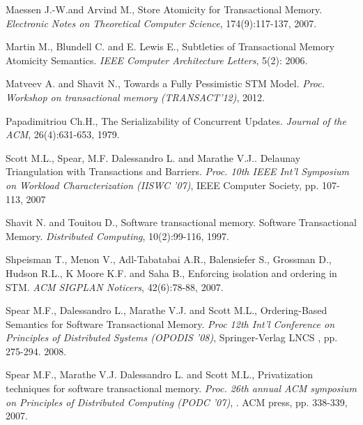\documentclass[11pt,letterpaper]{article}
\begin{document}
{\begin{thebibliography}{guerraoui08}
 Maessen J.-W.and Arvind M.,
 Store Atomicity for Transactional Memory. 
{\it Electronic  Notes  on Theoretical  Computer Science}, 
174(9):117-137, 2007.


 Martin M.,  Blundell C.  and E. Lewis E.,
 Subtleties of Transactional Memory Atomicity Semantics. 
{\it IEEE Computer Architecture  Letters},  5(2):  2006.


Matveev A. and  Shavit N.,
Towards a Fully Pessimistic STM Model. 
{\it Proc. Workshop on transactional memory (TRANSACT'12)}, 2012.



Papadimitriou Ch.H., 
The Serializability of Concurrent Updates. 
{\it Journal of the ACM},  26(4):631-653, 1979. 


 Scott M.L.,  Spear, M.F. Dalessandro L.  and  Marathe V.J..
 Delaunay Triangulation with Transactions and Barriers. 
{\it Proc.  10th IEEE Int'l Symposium on Workload Characterization (IISWC '07)},
 IEEE Computer Society, pp. 107-113, 2007





 Shavit N. and  Touitou D.,
 Software transactional memory. 
Software Transactional Memory. 
{\it Distributed  Computing}, 10(2):99-116, 1997. 


 Shpeisman T.,  Menon V.,  Adl-Tabatabai A.R.,  Balensiefer  S.,  Grossman D.,
 Hudson R.L., K Moore K.F.  and  Saha B., 
Enforcing isolation and ordering in STM. 
{\it ACM  SIGPLAN Noticers}, 42(6):78-88,  2007.





Spear M.F.,  Dalessandro L.,  Marathe V.J. and  Scott M.L., 
Ordering-Based Semantics for Software Transactional Memory. 
{\it Proc  12th Int'l Conference on Principles of Distributed Systems 
(OPODIS '08)},  Springer-Verlag LNCS , pp. 275-294. 2008. 



Spear M.F.,  Marathe V.J. Dalessandro L. and  Scott M.L., 
Privatization techniques for software transactional memory. 
{\it Proc. 26th  annual ACM symposium on Principles of Distributed Computing 
(PODC '07)}, . ACM press, pp.  338-339, 2007.



\end{thebibliography}

}
\end{document}
